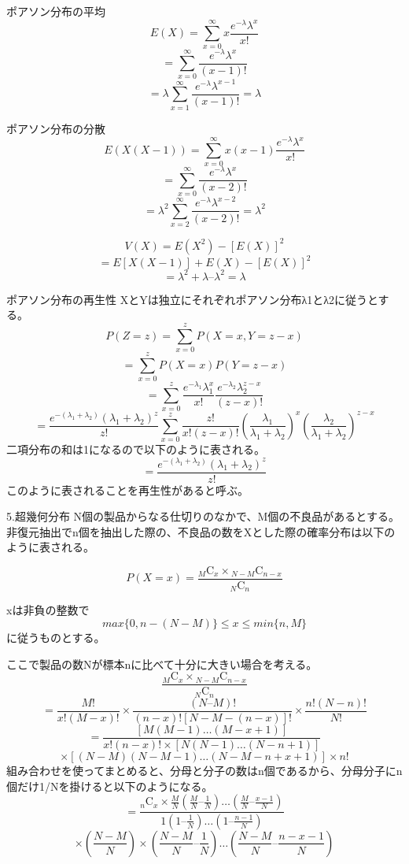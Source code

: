 \documentclass[]{article}
\begin{document}
ポアソン分布の平均
\[E(X)=\sum_{x=0}^{\infty}x \frac{e^{-\lambda}\lambda^x}{x!}\]
\[ =\sum_{x=0}^{\infty} \frac{e^{-\lambda}\lambda^x}{(x-1)!}\]
\[ =\lambda \sum_{x=1}^{\infty} \frac{e^{-\lambda}\lambda^{x-1}}{(x-1)!} = \lambda \]

ポアソン分布の分散
\[E(X(X-1)) = \sum_{x=0}^{\infty}x(x-1) \frac{e^{-\lambda}\lambda^x}{x!}\]
\[ = \sum_{x=0}^{\infty} \frac{e^{-\lambda}\lambda^x}{(x-2)!}\]
\[ = \lambda^2 \sum_{x=2}^{\infty} \frac{e^{-\lambda}\lambda^{x-2}}{(x-2)!} =\lambda^2 \]

\[V(X)=E(X^2)-[ E(X) ]^2\] \[ =E[X(X-1)] + E(X) -[ E(X) ]^2\]
\[ = \lambda^2 + \lambda – \lambda^2 = \lambda \]

ポアソン分布の再生性
XとYは独立にそれぞれポアソン分布λ1とλ2に従うとする。
\[P(Z=z) = \sum_{x=0}^{z} P(X=x, Y=z-x) \]
\[ = \sum_{x=0}^{z} P(X=x)P(Y=z-x) \]
\[ = \sum_{x=0}^{z} \frac{e^{-\lambda_1} \lambda_1^x }{x!} \frac{e^{-\lambda_2} \lambda_2^{z-x} }{(z-x)!} \]
\[ = \frac{e^{-(\lambda_1 + \lambda_2 )}(\lambda_1 + \lambda_2)^z}{z!} \sum_{x=0}^{z}\frac{z!}{x!(z-x)!}\left( \frac{\lambda_1}{\lambda_1+\lambda_2} \right)^x \left( \frac{\lambda_2}{\lambda_1+\lambda_2} \right)^{z-x} \]
二項分布の和は1になるので以下のように表される。
\[ = \frac{e^{-(\lambda_1 + \lambda_2 )}(\lambda_1 + \lambda_2)^z}{z!} \]
このように表されることを再生性があると呼ぶ。

5.超幾何分布 N個の製品からなる仕切りのなかで、M個の不良品があるとする。
非復元抽出でn個を抽出した際の、不良品の数をXとした際の確率分布は以下のように表される。

\[P(X=x)=\frac{{}_M \mathrm{C} _x \times {}_{N-M} \mathrm{C} _{n-x}}{{}_N \mathrm{C} _n} \]

xは非負の整数で \[max \{ 0, n -(N-M) \} \leq x \leq min \{ n, M \}\]
に従うものとする。

ここで製品の数Nが標本nに比べて十分に大きい場合を考える。
\[\frac{{}_M \mathrm{C} _x \times {}_{N-M} \mathrm{C} _{n-x}}{{}_N \mathrm{C} _n} \]
\[ = \frac{M!}{x!\left( M-x \right)!} \times \frac{\left( N – M \right)! }{\left( n-x\right)! \left[ N-M -\left( n-x\right) \right]!} \times \frac{n! \left(N-n\right)!}{N!} \]
\[ = \frac{\left[ M(M-1)\dots (M-x+1)\right] }{x!(n-x)! \times \left[ N(N-1)\dots (N-n+1) \right]}\]
\[ \times \left[ (N-M)(N-M-1)\dots (N-M-n+x+1)\right]\times n! \]
組み合わせを使ってまとめると、分母と分子の数はn個であるから、分母分子にn個だけ1/Nを掛けると以下のようになる。
\[ = \frac{{}_n \mathrm{C} _x \times \frac{M}{N} \left( \frac{M}{N} – \frac{1}{N} \right) \dots \left( \frac{M}{N} – \frac{x-1}{N} \right) }{1 \left( 1 – \frac{1}{N} \right) \dots \left( 1 – \frac{n-1}{N} \right) } \]
\[ \times \left( \frac{N-M}{N} \right) \times \left( \frac{N-M}{N} – \frac{1}{N} \right) \dots \left( \frac{N-M}{N} – \frac{n-x-1}{N} \right) \]
\end{document}
